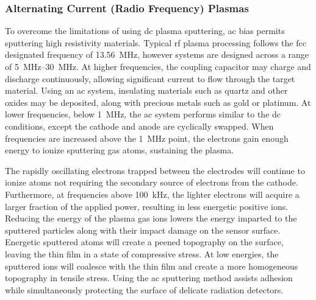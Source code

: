 \documentclass[../../../main.tex]{subfiles}
\begin{document}
%
    \subsubsection{Alternating Current (Radio Frequency) Plasmas}%
    \label{app:thin-film-processing:plasma-sputtering:ac-plasmas}%
    To overcome the limitations of using \gls{dc} plasma sputtering, \gls{ac} bias permits sputtering high resistivity materials.
    Typical \gls{rf} plasma processing follows the \gls{fcc} designated frequency of \SI{13.56}{\mega\hertz}, however systems are designed across a range of \SIrange{5}{30}{\mega\hertz}.
    At higher frequencies, the coupling capacitor may charge and discharge continuously, allowing significant current to flow through the target material.
    Using an \gls{ac} system, insulating materials such as quartz and other oxides may be deposited, along with precious metals such as gold or platinum.
    At lower frequencies, below \SI{1}{\mega\hertz}, the \gls{ac} system performs similar to the \gls{dc} conditions, except the cathode and anode are cyclically swapped.
    When frequencies are increased above the \SI{1}{\mega\hertz} point, the electrons gain enough energy to ionize sputtering gas atoms, sustaining the plasma. 
    \par%
    The rapidly oscillating electrons trapped between the electrodes will continue to ionize atoms not requiring the secondary source of electrons from the cathode.
    Furthermore, at frequencies above \SI{100}{\kilo\hertz}, the lighter electrons will acquire a larger fraction of the applied power, resulting in less energetic positive ions.
    Reducing the energy of the plasma gas ions lowers the energy imparted to the sputtered particles along with their impact damage on the sensor surface.
    Energetic sputtered atoms will create a peened topography on the surface, leaving the thin film in a state of compressive stress.
    At low energies, the sputtered ions will coalesce with the thin film and create a more homogeneous topography in tensile stress.
    Using the \gls{ac} sputtering method assists adhesion while simultaneously protecting the surface of delicate radiation detectors.
\end{document}
